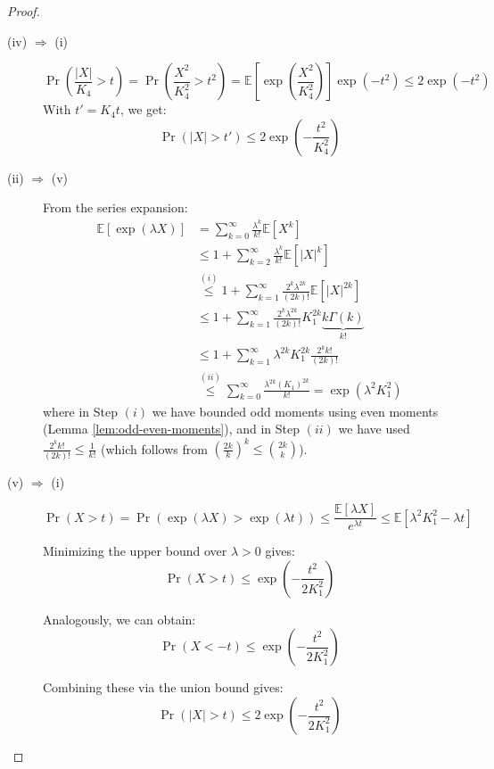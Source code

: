 \documentclass{article}
\theoremstyle{remark}
\newcommand{\Exp}{\mathbb{E}}
\begin{document}
\begin{proof}
\begin{description}
\item [(iv) \(\Rightarrow\) (i)]
\begin{equation*}
\Pr\left(\frac{|X|}{K_{4}} > t\right) = \Pr\left(\frac{X^{2}}{K_{4}^{2}} > t^{2}\right) = \Exp\left[\exp\left(\frac{X^{2}}{K_{4}^{2}}\right)\right]\exp(-t^{2}) \leq 2\exp(-t^{2})
\end{equation*}
With \(t' = K_{4}t\), we get:
\begin{equation*}
\Pr(|X| > t') \leq 2\exp\left(-\frac{t^{2}}{K_{4}^{2}}\right)
\end{equation*}

\item [(ii) \(\Rightarrow\) (v)]
From the series expansion:
\begin{align*}
\Exp[\exp(\lambda X)] &= \sum_{k=0}^{\infty}\frac{\lambda^{k}}{k!}\Exp[X^{k}] \\
&\leq 1 + \sum_{k=2}^{\infty} \frac{\lambda^{k}}{k!}\Exp[|X|^{k}] \\
&\overset{(i)}\leq 1 + \sum_{k=1}^{\infty} \frac{2^{k}\lambda^{2k}}{(2k)!}\Exp[|X|^{2k}] \\
&\leq 1 + \sum_{k=1}^{\infty} \frac{2^{k}\lambda^{2k}}{(2k)!} K_{1}^{2k}\underbrace{k\Gamma(k)}_{k!} \\
&\leq 1 + \sum_{k=1}^{\infty} \lambda^{2k}K_{1}^{2k} \frac{2^{k}k!}{(2k)!} \\
&\overset{(ii)}\leq \sum_{k=0}^{\infty} \frac{\lambda^{2k}(K_{1})^{2k}}{k!} = \exp(\lambda^{2}K_{1}^{2})
\end{align*}
where in Step \((i)\) we have bounded odd moments using even moments (Lemma \ref{lem:odd-even-moments}), and in Step \((ii)\) we have used \(\frac{2^{k}k!}{(2k)!} \leq \frac{1}{k!}\) (which follows from \(\left(\frac{2k}{k}\right)^{k} \leq \binom{2k}{k}\)).

\item [(v) \(\Rightarrow\) (i)]
\begin{equation*}
\Pr\left(X > t\right) = \Pr\left(\exp(\lambda X) > \exp(\lambda t)\right) \leq \frac{\Exp\left[\lambda X\right]}{e^{\lambda t}} \leq \Exp\left[\lambda^{2}K_{1}^{2} - \lambda t\right]
\end{equation*}

Minimizing the upper bound over \(\lambda > 0\) gives:
\begin{equation*}
\Pr\left(X > t\right) \leq \exp\left(-\frac{t^{2}}{2K_{1}^{2}}\right)
\end{equation*}

Analogously, we can obtain:
\begin{equation*}
\Pr\left(X < -t\right) \leq \exp\left(-\frac{t^{2}}{2K_{1}^{2}}\right)
\end{equation*}

Combining these via the union bound gives:
\begin{equation*}
\Pr\left(|X| > t\right) \leq 2\exp\left(-\frac{t^{2}}{2K_{1}^{2}}\right)
\end{equation*}
\end{description}
\end{proof}
\end{document}
